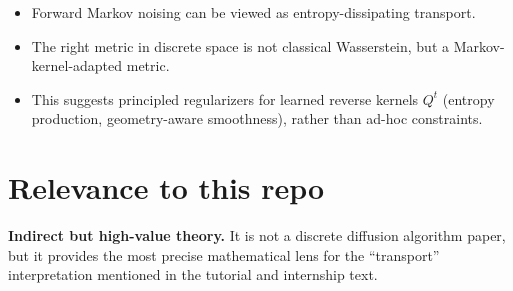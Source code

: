 \documentclass[11pt]{article}
\begin{document}
\begin{itemize}
\item Forward Markov noising can be viewed as entropy-dissipating transport.
\item The right metric in discrete space is not classical Wasserstein, but a Markov-kernel-adapted metric.
\item This suggests principled regularizers for learned reverse kernels $Q^t$ (entropy production, geometry-aware smoothness), rather than ad-hoc constraints.
\end{itemize}

\section*{Relevance to this repo}
\textbf{Indirect but high-value theory.}
It is not a discrete diffusion algorithm paper, but it provides the most precise mathematical lens for the ``transport'' interpretation mentioned in the tutorial and internship text.
\end{document}
